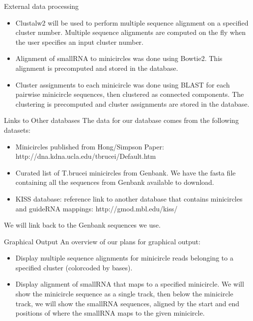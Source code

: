 \documentclass[a4paper,10pt,notitlepage]{article}
\begin{document}
\begin{section}{External data processing}
    \begin{itemize}
        \item Clustalw2 will be used to perform multiple sequence alignment on a specified cluster number. Multiple sequence 
            alignments are computed on the fly when the user specifies an input cluster number.
        \item Alignment of smallRNA to minicircles was done using Bowtie2. This alignment is precomputed and stored in the 
            database.
        \item Cluster assignments to each minicircle was done using BLAST for each pairwise minicircle sequences, then clustered 
            as connected components. The clustering is precomputed and cluster assignments are stored in the database.
    \end{itemize}
\end{section}

\begin{section}{Links to Other databases}
    The data for our database comes from the following datasets:

    \begin{itemize}
        \item Minicircles published from Hong/Simpson Paper: http://dna.kdna.ucla.edu/tbrucei/Default.htm
        \item Curated list of T.brucei minicircles from Genbank. We have the fasta file containing all the sequences 
            from Genbank available to download.
        \item KISS database: reference link to another database that contains minicircles and guideRNA mappings: 
            http://gmod.mbl.edu/kiss/
    \end{itemize}

    We will link back to the Genbank sequences we use.

\end{section}

\begin{section}{Graphical Output}
    An overview of our plans for graphical output:

    \begin{itemize}
        \item Display multiple sequence alignments for minicircle reads belonging to a specified cluster (colorcoded by bases).
        \item Display alignment of smallRNA that maps to a specified minicircle. We will show the minicircle sequence as a 
            single track, then below the minicircle track, we will show the smallRNA sequences, aligned by the start and end 
            positions of where the smallRNA maps to the given minicircle. 
    \end{itemize}

\end{section}
            
\end{document}
